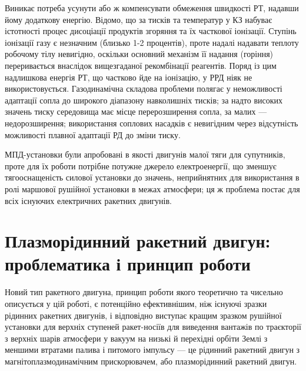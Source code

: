 Виникає потреба усунути або ж компенсувати обмеження швидкості РТ, надавши йому додаткову енергію. Відомо, що за тисків та температур у КЗ набуває істотності процес дисоціації продуктів згоряння та їх часткової іонізації. Ступінь іонізації газу є незначним (близько 1-2 процентів), проте надалі надавати теплоту робочому тілу невигідно, оскільки основний механізм її надання (горіння) переривається внаслідок вищезгаданої рекомбінації реагентів. Поряд із цим надлишкова енергія РТ, що частково йде на іонізацію, у РРД ніяк не використовується. Газодинамічна складова проблеми полягає у неможливості адаптації сопла до широкого діапазону навколишніх тисків; за надто високих значень тиску середовища має місце перерозширення сопла, за малих --- недорозширення; використання соплових насадків є невигідним через відсутність можливості плавної адаптації РД до зміни тиску.

МПД-установки були апробовані в якості двигунів малої тяги для супутників, проте для їх роботи потрібне потужне джерело електроенергії, що зменшує тягооснащеність силової установки до значень, неприйнятних для використання в ролі маршової рушійної установки в межах атмосфери; ця ж проблема постає для всіх існуючих електричних ракетних двигунів.


\section{Плазморідинний ракетний двигун: проблематика і принцип роботи}

Новий тип ракетного двигуна, принцип роботи якого теоретично та чисельно описується у цій роботі, є потенційно ефективнішим, ніж існуючі зразки рідинних ракетних двигунів, і відповідно виступає кращим зразком рушійної установки для верхніх ступеней ракет-носіїв для виведення вантажів по траєкторії з верхніх шарів атмосфери у вакуум на низькі й перехідні орбіти Землі з меншими втратами палива і питомого імпульсу --- це рідинний ракетний двигун з магнітоплазмодинамічним прискорювачем, або плазморідинний ракетний двигун.

